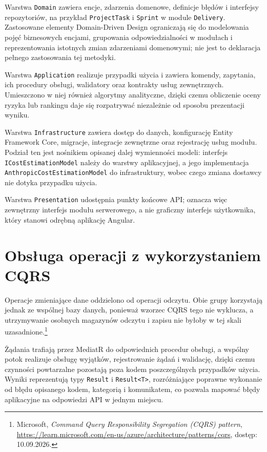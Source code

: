 Warstwa \texttt{Domain} zawiera encje, zdarzenia domenowe, definicje błędów i interfejsy repozytoriów, na przykład \texttt{ProjectTask} i \texttt{Sprint} w module \texttt{Delivery}. Zastosowane elementy Domain-Driven Design ograniczają się do modelowania pojęć biznesowych encjami, grupowania odpowiedzialności w modułach i reprezentowania istotnych zmian zdarzeniami domenowymi; nie jest to deklaracja pełnego zastosowania tej metodyki.

Warstwa \texttt{Application} realizuje przypadki użycia i zawiera komendy, zapytania, ich procedury obsługi, walidatory oraz kontrakty usług zewnętrznych. Umieszczono w niej również algorytmy analityczne, dzięki czemu obliczenie oceny ryzyka lub rankingu daje się rozpatrywać niezależnie od sposobu prezentacji wyniku.

Warstwa \texttt{Infrastructure} zawiera dostęp do danych, konfigurację Entity Framework Core, migracje, integracje zewnętrzne oraz rejestrację usług modułu. Podział ten jest nośnikiem opisanej dalej wymienności modeli: interfejs \texttt{ICostEstimationModel} należy do warstwy aplikacyjnej, a jego implementacja \texttt{AnthropicCostEstimationModel} do infrastruktury, wobec czego zmiana dostawcy nie dotyka przypadku użycia.

Warstwa \texttt{Presentation} udostępnia punkty końcowe API; oznacza więc zewnętrzny interfejs modułu serwerowego, a nie graficzny interfejs użytkownika, który stanowi odrębną aplikację Angular.

\section{Obsługa operacji z wykorzystaniem CQRS}

Operacje zmieniające dane oddzielono od operacji odczytu. Obie grupy korzystają jednak ze wspólnej bazy danych, ponieważ wzorzec CQRS tego nie wyklucza, a utrzymywanie osobnych magazynów odczytu i zapisu nie byłoby w tej skali uzasadnione.\footnote{Microsoft, \textit{Command Query Responsibility Segregation (CQRS) pattern}, \url{https://learn.microsoft.com/en-us/azure/architecture/patterns/cqrs}, dostęp: 10.09.2026.}

Żądania trafiają przez MediatR do odpowiednich procedur obsługi, a wspólny potok realizuje obsługę wyjątków, rejestrowanie żądań i walidację, dzięki czemu czynności powtarzalne pozostają poza kodem poszczególnych przypadków użycia. Wyniki reprezentują typy \texttt{Result} i \texttt{Result<T>}, rozróżniające poprawne wykonanie od błędu opisanego kodem, kategorią i komunikatem, co pozwala mapować błędy aplikacyjne na odpowiedzi API w jednym miejscu.

